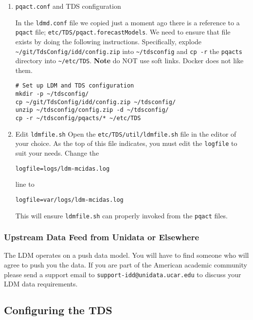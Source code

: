 \documentclass[11pt]{article}
\begin{document}
\begin{enumerate}
\item \texttt{pqact.conf} and TDS configuration
\label{sec:orgheadline20}

In the \texttt{ldmd.conf} file we copied just a moment ago there is a reference to a \texttt{pqact} file; \texttt{etc/TDS/pqact.forecastModels}. We need to ensure that file exists by doing the following instructions. Specifically, explode \texttt{\textasciitilde{}/git/TdsConfig/idd/config.zip} into \texttt{\textasciitilde{}/tdsconfig} and \texttt{cp -r} the \texttt{pqacts} directory into \texttt{\textasciitilde{}/etc/TDS}. \textbf{Note} do NOT use soft links. Docker does not like them.

\begin{verbatim}
# Set up LDM and TDS configuration
mkdir -p ~/tdsconfig/
cp ~/git/TdsConfig/idd/config.zip ~/tdsconfig/
unzip ~/tdsconfig/config.zip -d ~/tdsconfig/
cp -r ~/tdsconfig/pqacts/* ~/etc/TDS
\end{verbatim}

\item Edit \texttt{ldmfile.sh}
\label{sec:orgheadline21}
\label{orgtarget2}
Open the \texttt{etc/TDS/util/ldmfile.sh} file in the editor of your choice. As the top of this file indicates, you must edit the \texttt{logfile} to suit your needs. Change the 

\begin{verbatim}
logfile=logs/ldm-mcidas.log
\end{verbatim}

line to

\begin{verbatim}
logfile=var/logs/ldm-mcidas.log
\end{verbatim}

This will ensure \texttt{ldmfile.sh} can properly invoked from the \texttt{pqact} files.
\end{enumerate}

\subsubsection{Upstream Data Feed from Unidata or Elsewhere}
\label{sec:orgheadline23}

The LDM operates on a push data model. You will have to find someone who will agree to push you the data. If you are part of the American academic community please send a support email to \texttt{support-idd@unidata.ucar.edu} to discuss your LDM data requirements.

\subsection{Configuring the TDS}
\label{sec:orgheadline26}
\end{document}
